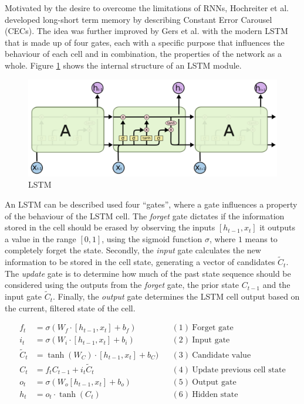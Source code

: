 Motivated by the desire to overcome the limitations of RNNs, Hochreiter et al. \cite{hochreiter1997long} developed long-short term memory by describing Constant Error Carousel (CECs). The idea was further improved by Gers et al. \cite{gers1999learning} with the modern LSTM that is made up of four gates, each with a specific purpose that influences the behaviour of each cell and in combination, the properties of the network as a whole. Figure \ref{fig:bg:lstm} shows the internal structure of an LSTM module.

\begin{figure}[ht]
  \centering
  \includegraphics[width=0.75\columnwidth]{sections/2background/images/lstm.png}
  \caption[Structure of an unrolled LSTM]{LSTM}
  \label{fig:bg:lstm}
\end{figure}

An LSTM can be described used four ``gates'', where a gate influences a property of the behaviour of the LSTM cell. The \textit{forget} gate dictates if the information stored in the cell should be erased by observing the inputs $[h_{t-1}, x_t]$ it outputs a value in the range $[0, 1]$, using the sigmoid function $\sigma$, where $1$ means to completely forget the state. Secondly, the \textit{input} gate calculates the new information to be stored in the cell state, generating a vector of candidates $\tilde{C}_t$. The \textit{update} gate is to determine how much of the past state sequence should be considered using the outputs from the \textit{forget} gate, the prior state $C_{t-1}$ and the input gate $\tilde{C}_t$. Finally, the \textit{output} gate determines the LSTM cell output based on the current, filtered state of the cell.

\begin{center}
  \begin{align*}
    f_t &= \sigma (W_f \cdot [h_{t-1}, x_t] + b_f) && (1)~\text{Forget gate} \\
    i_t &= \sigma (W_i \cdot [h_{t-1}, x_t] + b_i) && (2)~\text{Input gate} \\
    \tilde{C}_t &= \tanh (W_C) \cdot [h_{t-1}, x_t] + b_C) && (3)~\text{Candidate value} \\
    C_t &= f_t C_{t-1} + i_t \tilde{C}_t && (4)~\text{Update previous cell state} \\
    o_t &= \sigma (W_o [h_{t-1}, x_t] + b_o) && (5)~\text{Output gate} \\
    h_t &= o_t \cdot \tanh (C_t) && (6)~\text{Hidden state}
  \end{align*}
\end{center}

